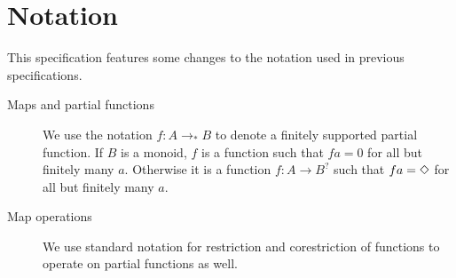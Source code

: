\newcommand{\pto}{\to_{*}}

\section{Notation}

This specification features some changes to the notation used in previous specifications.

\begin{description}
\item[Maps and partial functions] We use the notation $f : A \pto B$
  to denote a finitely supported partial function. If $B$ is a monoid,
  $f$ is a function such that $f a = 0$ for all but finitely many
  $a$. Otherwise it is a function $f : A \to B^?$ such that
  $f a = \Diamond$ for all but finitely many $a$.
\item[Map operations] We use standard notation for restriction and
  corestriction of functions to operate on partial functions as well.
\end{description}

